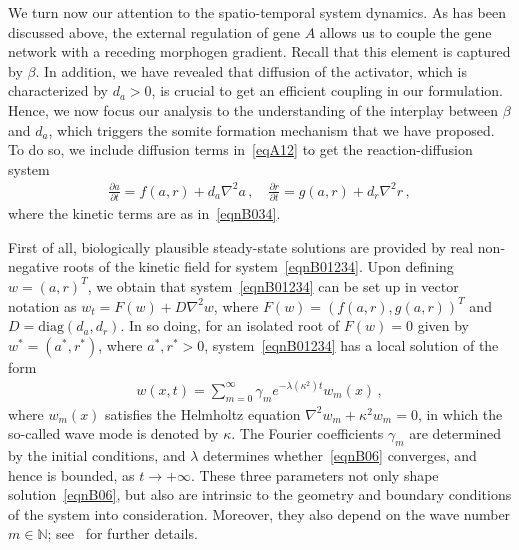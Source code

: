 \documentclass[%
 preprint,
 aip, 
 amsmath,amssymb,
]{revtex4-2}
\begin{document}
We turn now our attention to the spatio-temporal system dynamics. As has been discussed above, the external regulation of gene $A$ allows us to couple the gene network with a receding morphogen gradient. Recall that this element is captured by $\beta$. In addition, we have revealed that diffusion of the activator, which is characterized by $d_a>0$, is crucial to get an efficient coupling in our formulation. Hence, we now focus our analysis to the understanding of the interplay between $\beta$ and $d_a$, which triggers the somite formation mechanism that we have proposed. To do so, we include diffusion terms in~\eqref{eqA12} to get the reaction-diffusion system
		\begin{gather}\label{eqnB01234}
		\frac{\partial{a}}{\partial{t}}= f(a,r)+d_a\nabla^2a\,, \quad \frac{\partial{r}}{\partial{t}} = g(a,r)+d_r\nabla^2r\,,%
		\end{gather}
		where the kinetic terms are as in~\eqref{eqnB034}. 

First of all, biologically plausible steady-state solutions are provided by real non-negative roots of the kinetic field for system~\eqref{eqnB01234}. Upon defining $w=(a,r)^T$, we obtain that system~\eqref{eqnB01234} can be set up in vector notation as $w_t = F(w) + D \nabla^2 w$, where
	$F(w) = \left(f(a,r),g(a,r)\right)^T$ and $D=\textrm{diag}\left(d_a, d_r \right)$. In so doing, for an isolated root of $F(w)=0$ given by $w^*=(a^*,r^*)$, where $a^*,r^*>0$, system~\eqref{eqnB01234} has a local solution of the form 
	\begin{gather}\label{eqnB06}
	w(x,t)= \sum_{m=0}^{\infty}\gamma_me^{-\lambda\left(\kappa^2\right) t}w_m(x)\,,%
	\end{gather}
	where $w_m(x)$ satisfies the Helmholtz equation $\nabla^2w_m+\kappa^2w_m=0$, in which the so-called wave mode is denoted by $\kappa$. The Fourier coefficients $\gamma_m$ are determined by the initial conditions, and $\lambda$ determines whether~\eqref{eqnB06} converges, and hence is bounded, as $t\to+\infty$. These three parameters not only shape solution~\eqref{eqnB06}, but also are intrinsic to the geometry and boundary conditions of the system into consideration. Moreover, they also depend on the wave number $m\in\mathbb{N}$; see~\cite{Murray1989} for further details. 
\end{document}
